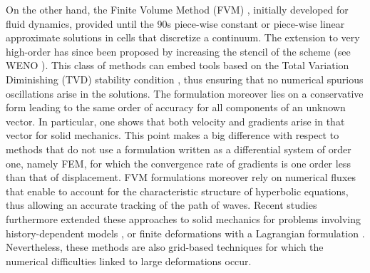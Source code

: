 On the other hand, the Finite Volume Method (FVM) \cite{Leveque}, initially developed for fluid dynamics, provided until the 90s piece-wise constant or piece-wise linear approximate solutions in cells that discretize a continuum.
The extension to very high-order has since been proposed by increasing the stencil of the scheme (see WENO \cite{WENO}).
This class of methods can embed tools based on the Total Variation Diminishing (TVD) stability condition \cite{Harten}, thus ensuring that no numerical spurious oscillations arise in the solutions. 
The formulation moreover lies on a conservative form leading to the same order of accuracy for all components of an unknown vector.
In particular, one shows that both velocity and gradients arise in that vector for solid mechanics.
This point makes a big difference with respect to methods that do not use a formulation written as a differential system of order one, namely FEM, for which the convergence rate of gradients is one order less than that of displacement.
FVM formulations moreover rely on numerical fluxes that enable to account for the characteristic structure of hyperbolic equations, thus allowing an accurate tracking of the path of waves.
Recent studies furthermore extended these approaches to solid mechanics for problems involving history-dependent models \cite{Gavrilyuk,Thomas_EP}, or finite deformations with a Lagrangian formulation \cite{Lee_FVM,Haider_FVM}.
Nevertheless, these methods are also grid-based techniques for which the numerical difficulties linked to large deformations occur.

